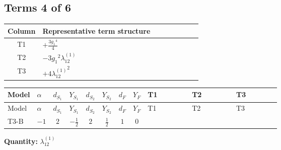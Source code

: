 \documentclass[8pt]{article}
\begin{document}
\begin{landscape}
\subsection*{Terms 4 of 6}
\begin{center}
\begin{tabular}{@{}c >{\raggedright\arraybackslash}p{0.82\linewidth}@{}}
\toprule
Column & Representative term structure \\
\midrule
T1 & \(\displaystyle +\frac{3 {g_1}^4}{4}\) \\
\midrule
T2 & \(\displaystyle -3 {g_1}^2 {\lambda_{12}^{(1)}}\) \\
\midrule
T3 & \(\displaystyle +4 {\lambda_{12}^{(1)}}^2\) \\
\midrule
\bottomrule
\end{tabular}
\end{center}
\smallskip
\tiny
\begin{longtable}{@{}llcccccc >{\raggedright\arraybackslash}p{0.21\linewidth} >{\raggedright\arraybackslash}p{0.21\linewidth} >{\raggedright\arraybackslash}p{0.21\linewidth}@{}}
\toprule
Model & $\alpha$ & $d_{S_1}$ & $Y_{S_1}$ & $d_{S_2}$ & $Y_{S_2}$ & $d_F$ & $Y_F$ & T1 & T2 & T3 \\
\midrule
\endfirsthead
\toprule
Model & $\alpha$ & $d_{S_1}$ & $Y_{S_1}$ & $d_{S_2}$ & $Y_{S_2}$ & $d_F$ & $Y_F$ & T1 & T2 & T3 \\
\midrule
\endhead
T3-B & $-1$ & $2$ & $-\frac{1}{2}$ & $2$ & $\frac{1}{2}$ & $1$ & $0$ & \scriptsize\adjustbox{max width=\linewidth}{$\begin{gathered} +\frac{3 {g_1}^4}{4}\end{gathered}$} & \scriptsize\adjustbox{max width=\linewidth}{$\begin{gathered} -3 {g_1}^2 {\lambda_{12}^{(1)}}\end{gathered}$} & \scriptsize\adjustbox{max width=\linewidth}{$\begin{gathered} +4 {\lambda_{12}^{(1)}}^2\end{gathered}$} \\
\midrule
\bottomrule
\end{longtable}
\clearpage
\noindent\textbf{Quantity: }$\lambda_{12}^{(1)}$\par\smallskip

\end{landscape}
\end{document}
